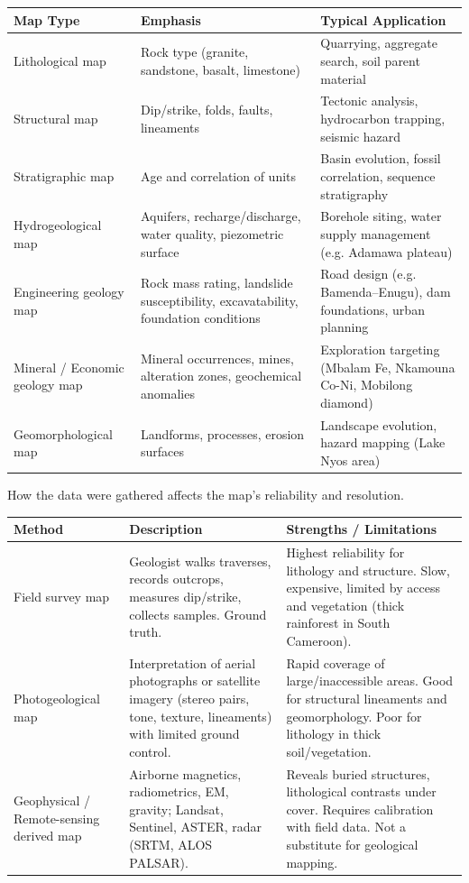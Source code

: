 \documentclass[11pt]{article}
\newcommand{\cle}[1]{{\popxbold\color{popdark}#1}}
\newcounter{popsec}
\newcounter{popsub}
\newcommand{\courssub}[1]{%
  \stepcounter{popsub}%
  \par\vspace{9pt}\noindent{\popxbold\fontsize{11.5}{13}\selectfont\color{popink}{\color{poporange}\thepopsec.\thepopsub}\hspace{6pt}#1}\par\nopagebreak\vspace{4pt}
}
\begin{document}
\begin{center}
\begin{tabularx}{\linewidth}{|l|X|X|}
\hline
\rowcolor{popblueL}
\textbf{Map Type} & \textbf{Emphasis} & \textbf{Typical Application} \\
\hline
\cle{Lithological map} & Rock type (granite, sandstone, basalt, limestone) & Quarrying, aggregate search, soil parent material \\
\cle{Structural map} & Dip/strike, folds, faults, lineaments & Tectonic analysis, hydrocarbon trapping, seismic hazard \\
\cle{Stratigraphic map} & Age and correlation of units & Basin evolution, fossil correlation, sequence stratigraphy \\
\cle{Hydrogeological map} & Aquifers, recharge/discharge, water quality, piezometric surface & Borehole siting, water supply management (e.g. Adamawa plateau) \\
\cle{Engineering geology map} & Rock mass rating, landslide susceptibility, excavatability, foundation conditions & Road design (e.g. Bamenda–Enugu), dam foundations, urban planning \\
\cle{Mineral / Economic geology map} & Mineral occurrences, mines, alteration zones, geochemical anomalies & Exploration targeting (Mbalam Fe, Nkamouna Co-Ni, Mobilong diamond) \\
\cle{Geomorphological map} & Landforms, processes, erosion surfaces & Landscape evolution, hazard mapping (Lake Nyos area) \\
\hline
\end{tabularx}
\end{center}

\courssub{Classification by Production Method}

How the data were gathered affects the map's reliability and resolution.

\begin{center}
\begin{tabularx}{\linewidth}{|l|X|X|}
\hline
\rowcolor{popblueL}
\textbf{Method} & \textbf{Description} & \textbf{Strengths / Limitations} \\
\hline
\cle{Field survey map} & Geologist walks traverses, records outcrops, measures dip/strike, collects samples. Ground truth. & Highest reliability for lithology and structure. Slow, expensive, limited by access and vegetation (thick rainforest in South Cameroon). \\
\cle{Photogeological map} & Interpretation of aerial photographs or satellite imagery (stereo pairs, tone, texture, lineaments) with limited ground control. & Rapid coverage of large/inaccessible areas. Good for structural lineaments and geomorphology. Poor for lithology in thick soil/vegetation. \\
\cle{Geophysical / Remote-sensing derived map} & Airborne magnetics, radiometrics, EM, gravity; Landsat, Sentinel, ASTER, radar (SRTM, ALOS PALSAR). & Reveals buried structures, lithological contrasts under cover. Requires calibration with field data. Not a substitute for geological mapping. \\
\hline
\end{tabularx}
\end{center}
\end{document}
